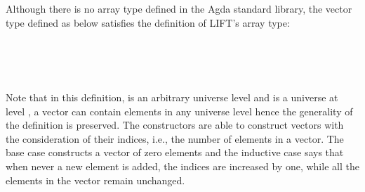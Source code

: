 \documentclass{l4proj}
\begin{document}
Although there is no array type defined in the Agda standard library, the vector type  defined as below satisfies the definition of LIFT's array type:
\begin{code}%
\>[0]\<%
\\
\>[0]\AgdaSpace{}%
\AgdaSpace{}%
\AgdaSymbol{(}\AgdaSpace{}%
\AgdaSymbol{:}\AgdaSpace{}%
\AgdaSpace{}%
\AgdaSymbol{)}\AgdaSpace{}%
\AgdaSymbol{:}\AgdaSpace{}%
\AgdaSpace{}%
\AgdaSpace{}%
\AgdaSpace{}%
\AgdaSpace{}%
\<%
\\
\>[0][@{}l@{\AgdaIndent{0}}]%
\>[2]\AgdaInductiveConstructor{[]}%
\>[6]\AgdaSymbol{:}\AgdaSpace{}%
\AgdaSpace{}%
\AgdaSpace{}%
\<%
\\
%
\>[2]\AgdaSpace{}%
\AgdaSymbol{:}\AgdaSpace{}%
\AgdaSpace{}%
\AgdaSymbol{\{}\AgdaSymbol{\}}\AgdaSpace{}%
\AgdaSymbol{(}\AgdaSpace{}%
\AgdaSymbol{:}\AgdaSpace{}%
\AgdaSymbol{)}\AgdaSpace{}%
\AgdaSymbol{(}\AgdaSpace{}%
\AgdaSymbol{:}\AgdaSpace{}%
\AgdaSpace{}%
\AgdaSpace{}%
\AgdaSymbol{)}\AgdaSpace{}%
\AgdaSpace{}%
\AgdaSpace{}%
\AgdaSpace{}%
\AgdaSymbol{(}\AgdaSpace{}%
\AgdaSymbol{)}\<%
\end{code}

Note that in this definition,  is an arbitrary universe level and \AgdaSpace{} is a universe at level , a vector can contain elements in any universe level hence the generality of the definition is preserved. The constructors are able to construct vectors with the consideration of their indices, i.e., the number of elements in a vector. The base case constructs a vector of zero elements and the inductive case says that when never a new element is added, the indices are increased by one, while all the elements in the vector remain unchanged. 
\end{document}
